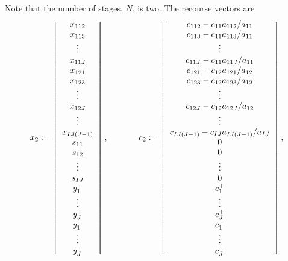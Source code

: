 Note that the number of stages, $N$, is two.  The recourse vectors are
\begin{equation*}
x_2:= \left[\begin{array}{c}
		x_{112}\\
		x_{113}\\
		\vdots\\
		x_{11J}\\
		x_{121}\\
		x_{123}\\
		\vdots\\
		x_{12J}\\
		\vdots\\
		x_{IJ(J-1)}\\
		s_{11}\\
		s_{12}\\
		\vdots\\
		s_{IJ}\\
		y_1^+\\
		\vdots\\
		y_J^+\\
		y_1^-\\
		\vdots\\
		y_J^-
		\end{array} \right],
\hspace{0.5in}
c_2:= \left[\begin{array}{c}
		c_{112} - c_{11}a_{112}/a_{11}\\
		c_{113} - c_{11}a_{113}/a_{11}\\
		\vdots\\
		c_{11J} - c_{11}a_{11J}/a_{11}\\
		c_{121} - c_{12}a_{121}/a_{12}\\
		c_{123} - c_{12}a_{123}/a_{12}\\
		\vdots\\
		c_{12J} - c_{12}a_{12J}/a_{12}\\
		\vdots\\
		c_{IJ(J-1)} - c_{IJ}a_{IJ(J-1)}/a_{IJ}\\
		0\\
		0\\
		\vdots\\
		0\\
		c_1^+\\
		\vdots\\
		c_J^+\\
		c_1^-\\
		\vdots\\
		c_J^-
		\end{array} \right],
\end{equation*}
